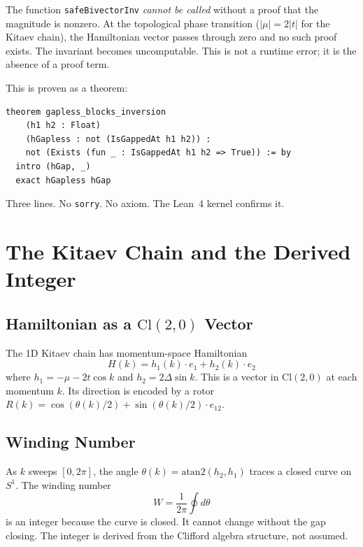 \documentclass[11pt,a4paper]{article}
\newcommand{\Cl}[1]{\mathrm{Cl}(#1)}
\newcommand{\eone}{e_1}
\newcommand{\etwo}{e_2}
\newcommand{\eonetwo}{e_{12}}
\begin{document}
The function \texttt{safeBivectorInv} \emph{cannot be called} without a proof that the magnitude is nonzero. At the topological phase transition ($|\mu| = 2|t|$ for the Kitaev chain), the Hamiltonian vector passes through zero and no such proof exists. The invariant becomes uncomputable. This is not a runtime error; it is the absence of a proof term.

This is proven as a theorem:

\begin{lstlisting}
theorem gapless_blocks_inversion
    (h1 h2 : Float)
    (hGapless : not (IsGappedAt h1 h2)) :
    not (Exists (fun _ : IsGappedAt h1 h2 => True)) := by
  intro (hGap, _)
  exact hGapless hGap
\end{lstlisting}

Three lines. No \texttt{sorry}. No axiom. The Lean~4 kernel confirms it.

\section{The Kitaev Chain and the Derived Integer}

\subsection{Hamiltonian as a \texorpdfstring{$\Cl{2,0}$}{Cl(2,0)} Vector}

The 1D Kitaev chain has momentum-space Hamiltonian
\begin{equation}
H(k) = h_1(k)\cdot\eone + h_2(k)\cdot\etwo
\end{equation}
where $h_1 = -\mu - 2t\cos k$ and $h_2 = 2\Delta\sin k$. This is a vector in $\Cl{2,0}$ at each momentum $k$. Its direction is encoded by a rotor $R(k) = \cos(\theta(k)/2) + \sin(\theta(k)/2)\cdot\eonetwo$.

\subsection{Winding Number}

As $k$ sweeps $[0, 2\pi]$, the angle $\theta(k) = \mathrm{atan2}(h_2, h_1)$ traces a closed curve on $S^1$. The winding number
\begin{equation}
W = \frac{1}{2\pi}\oint d\theta
\end{equation}
is an integer because the curve is closed. It cannot change without the gap closing. The integer is derived from the Clifford algebra structure, not assumed.
\end{document}
